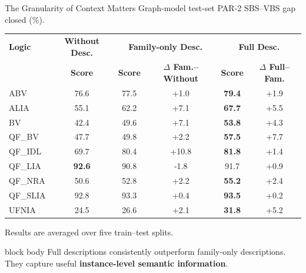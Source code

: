 \documentclass[aspectratio=169,11pt]{beamer}
\begin{document}
\begin{frame}{The Granularity of Context Matters}
  \centering
  \scriptsize
  Graph-model test-set PAR-2 SBS--VBS gap closed (\%).

  \vspace{0.55em}
  \renewcommand{\arraystretch}{1.15}
  \begin{tabular}{l c c c c c}
    \textbf{Logic}
      & \textbf{Without Desc.}
      & \multicolumn{2}{c}{\textbf{Family-only Desc.}}
      & \multicolumn{2}{c}{\textbf{Full Desc.}}\\[-0.15em]
    & \textbf{Score}
      & \textbf{Score} & \textbf{\(\Delta\) Fam.--Without}
      & \textbf{Score} & \textbf{\(\Delta\) Full--Fam.}\\ \hline
    ABV      & 76.6 & 77.5 & \textcolor{fusiongreen!80!black}{+1.0}
             & \textbf{\textcolor{winnerblue}{79.4}} & \textcolor{fusiongreen!80!black}{+1.9}\\
    ALIA     & 55.1 & 62.2 & \textcolor{fusiongreen!80!black}{+7.1}
             & \textbf{\textcolor{winnerblue}{67.7}} & \textcolor{fusiongreen!80!black}{+5.5}\\
    BV       & 42.4 & 49.6 & \textcolor{fusiongreen!80!black}{+7.1}
             & \textbf{\textcolor{winnerblue}{53.8}} & \textcolor{fusiongreen!80!black}{+4.3}\\
    QF\_BV   & 47.7 & 49.8 & \textcolor{fusiongreen!80!black}{+2.2}
             & \textbf{\textcolor{winnerblue}{57.5}} & \textcolor{fusiongreen!80!black}{+7.7}\\
    QF\_IDL  & 69.7 & 80.4 & \textcolor{fusiongreen!80!black}{+10.8}
             & \textbf{\textcolor{winnerblue}{81.8}} & \textcolor{fusiongreen!80!black}{+1.4}\\
    QF\_LIA  & \textbf{\textcolor{winnerblue}{92.6}} & 90.8
             & \textcolor{mutedtext}{-1.8} & 91.7 & \textcolor{fusiongreen!80!black}{+0.9}\\
    QF\_NRA  & 50.6 & 52.8 & \textcolor{fusiongreen!80!black}{+2.2}
             & \textbf{\textcolor{winnerblue}{55.2}} & \textcolor{fusiongreen!80!black}{+2.4}\\
    QF\_SLIA & 92.8 & 93.3 & \textcolor{fusiongreen!80!black}{+0.4}
             & \textbf{\textcolor{winnerblue}{93.5}} & \textcolor{fusiongreen!80!black}{+0.2}\\
    UFNIA    & 24.5 & 26.6 & \textcolor{fusiongreen!80!black}{+2.1}
             & \textbf{\textcolor{winnerblue}{31.8}} & \textcolor{fusiongreen!80!black}{+5.2}
  \end{tabular}

  \vspace{0.35em}
  \tiny
  Results are averaged over five train--test splits.

  \vfill
  \begin{beamercolorbox}[rounded=true,sep=0.5em,center]{block body}
    \small
    Full descriptions consistently outperform family-only descriptions.\\[0.15em]
    They capture useful \textbf{instance-level semantic information}.
  \end{beamercolorbox}
\end{frame}
\end{document}
